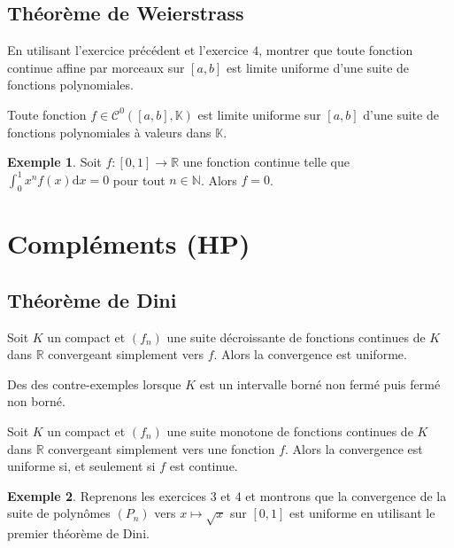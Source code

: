 \documentclass[french]{article}
\newcommand{\N}{\mathbb{N}}
\newcommand{\R}{\mathbb{R}}
\newcommand{\K}{\mathbb{K}}
\renewcommand{\d}{\text{d}}
\theoremstyle{plain}
\theoremstyle{definition}
\newtheorem*{ex}{Exemple}
\theoremstyle{remark}
\begin{document}
\subsection{Théorème de Weierstrass}

\begin{exo}
	En utilisant l'exercice précédent et l'exercice $4$, montrer que toute fonction continue affine par morceaux sur $[a,b]$ est limite uniforme d'une suite de fonctions polynomiales.
\end{exo}

\begin{thm}%
	Toute fonction $f\in\mathcal{C}^0([a,b],\K)$ est limite uniforme sur $[a,b]$ d'une suite de fonctions polynomiales à valeurs dans $\K$.
\end{thm}

\begin{ex}
	Soit $f:[0,1]\to\R$ une fonction continue telle que $\displaystyle\int_{0}^{1}x^nf(x)\d x=0$ pour tout $n\in\N$. Alors $f=0$.
\end{ex}

\section{Compléments (HP)}

\subsection{Théorème de Dini}

\begin{thm}%
	Soit $K$ un compact et $(f_n)$ une suite décroissante de fonctions continues de $K$ dans $\R$ convergeant simplement vers $f$. Alors la convergence est uniforme.
\end{thm}

\begin{exo}
	Des des contre-exemples lorsque $K$ est un intervalle borné non fermé puis fermé non borné.
\end{exo}

\begin{cor}%
	Soit $K$ un compact et $(f_n)$ une suite monotone de fonctions continues de $K$ dans $\R$ convergeant simplement vers une fonction $f$. Alors la convergence est uniforme si, et seulement si $f$ est continue.
\end{cor}

\begin{ex}
	Reprenons les exercices $3$ et $4$ et montrons que la convergence de la suite de polynômes $(P_n)$ vers $x\mapsto\sqrt{x}$ sur $[0,1]$ est uniforme en utilisant le premier théorème de Dini.
\end{ex}
\end{document}
